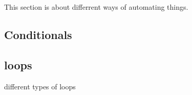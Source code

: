 
This section is about differrent ways of automating things.

\subsection{Conditionals}

\subsection{loops}

different types of loops
